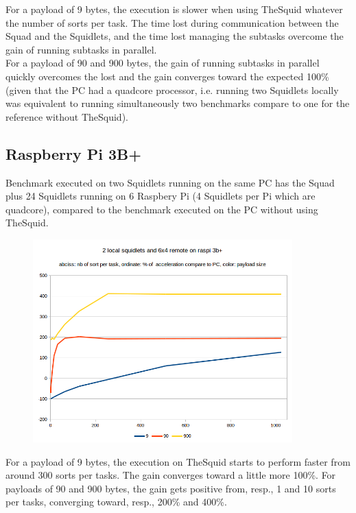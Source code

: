 For a payload of 9 bytes, the execution is slower when using TheSquid whatever the number of sorts per task. The time lost during communication between the Squad and the Squidlets, and the time lost managing the subtasks overcome the gain of running subtasks in parallel.\\

For a payload of 90 and 900 bytes, the gain of running subtasks in parallel quickly overcomes the lost and the gain converges toward the expected 100\% (given that the PC had a quadcore processor, i.e. running two Squidlets locally was equivalent to running simultaneously two benchmarks compare to one for the reference without TheSquid).\\

\subsection{Raspberry Pi 3B+}

Benchmark executed on two Squidlets running on the same PC has the Squad plus 24 Squidlets running on 6 Raspbery Pi (4 Squidlets per Pi which are quadcore), compared to the benchmark executed on the PC without using TheSquid.

\begin{center}
\begin{figure}[H]
\centering\includegraphics[width=10cm]{./benchmark02.png}\\
\end{figure}
\end{center}

For a payload of 9 bytes, the execution on TheSquid starts to perform faster from around 300 sorts per tasks. The gain converges toward a little more 100\%. For payloads of 90 and 900 bytes, the gain gets positive from, resp., 1 and 10 sorts per tasks, converging toward, resp., 200\% and 400\%.\\

